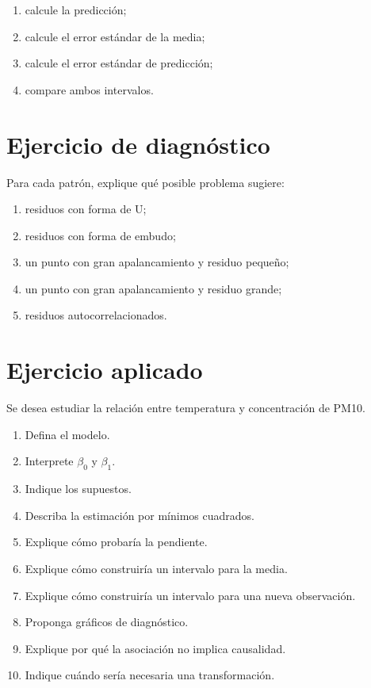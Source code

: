 \documentclass[
  spanish,
  11pt,
  letterpaper,
  DIV=11,
  numbers=noendperiod]{scrreprt}
\providecommand{\tightlist}{%
  \setlength{\itemsep}{0pt}\setlength{\parskip}{0pt}}
\theoremstyle{definition}
\theoremstyle{plain}
\theoremstyle{definition}
\theoremstyle{remark}
\begin{document}
\begin{enumerate}
\def\labelenumi{\arabic{enumi}.}
\tightlist
\item
  calcule la predicción;
\item
  calcule el error estándar de la media;
\item
  calcule el error estándar de predicción;
\item
  compare ambos intervalos.
\end{enumerate}

\section{Ejercicio de diagnóstico}\label{ejercicio-de-diagnuxf3stico}

Para cada patrón, explique qué posible problema sugiere:

\begin{enumerate}
\def\labelenumi{\arabic{enumi}.}
\tightlist
\item
  residuos con forma de U;
\item
  residuos con forma de embudo;
\item
  un punto con gran apalancamiento y residuo pequeño;
\item
  un punto con gran apalancamiento y residuo grande;
\item
  residuos autocorrelacionados.
\end{enumerate}

\section{Ejercicio aplicado}\label{ejercicio-aplicado-6}

Se desea estudiar la relación entre temperatura y concentración de PM10.

\begin{enumerate}
\def\labelenumi{\arabic{enumi}.}
\tightlist
\item
  Defina el modelo.
\item
  Interprete \(\beta_0\) y \(\beta_1\).
\item
  Indique los supuestos.
\item
  Describa la estimación por mínimos cuadrados.
\item
  Explique cómo probaría la pendiente.
\item
  Explique cómo construiría un intervalo para la media.
\item
  Explique cómo construiría un intervalo para una nueva observación.
\item
  Proponga gráficos de diagnóstico.
\item
  Explique por qué la asociación no implica causalidad.
\item
  Indique cuándo sería necesaria una transformación.
\end{enumerate}
\end{document}
